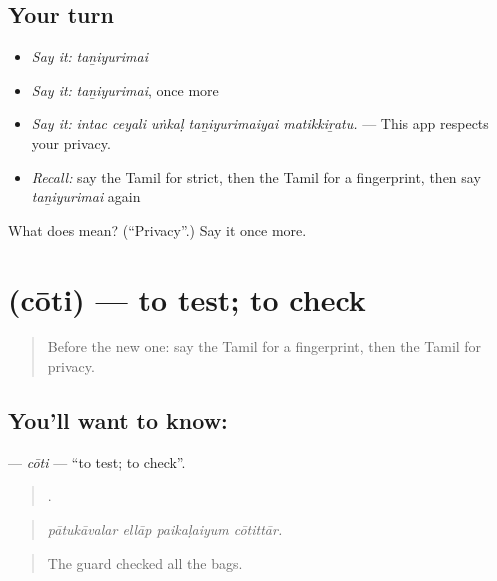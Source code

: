 \subsection*{Your turn}
\begin{itemize}
\raggedright
  \item \emph{Say it:} \emph{taṉiyurimai}
  \item \emph{Say it:} \emph{taṉiyurimai}, once more
  \item \emph{Say it:} \emph{intac ceyali uṅkaḷ taṉiyurimaiyai matikkiṟatu.} — This app respects your privacy.
  \item \emph{Recall:} say the Tamil for strict, then the Tamil for a fingerprint, then say \emph{taṉiyurimai} again
\end{itemize}

\begin{tcolorbox}[breakable,colback=teal!4,colframe=teal!35!black,title={Before you move on}]
What does  mean? (\textquotedblleft{}Privacy\textquotedblright{}.) Say it once more.
\end{tcolorbox}
\section[\texorpdfstring{\ta{சோதி} (cōti)}{சோதி (cōti)}]{ (cōti) — to test; to check}

\label{lesson:TA-C543-coti}



\begin{quote}
Before the new one: say the Tamil for a fingerprint, then the Tamil for privacy.
\end{quote}

\subsection*{You'll want to know: }
\textbf{} — \emph{cōti} — \textquotedblleft{}to test; to check\textquotedblright{}.

\begin{quote}
   .
\end{quote}

\begin{quote}
\emph{pātukāvalar ellāp paikaḷaiyum cōtittār.}
\end{quote}

\begin{quote}
The guard checked all the bags.
\end{quote}

